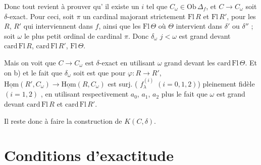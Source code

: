 \documentclass[11pt,a4paper]{article}
\begin{document}
Donc tout revient à prouver qu' il existe un $i$ 
tel que  $C_\omega \in \mathrm{Ob}\,\Delta_f$, et $C \to C_\omega$
soit $\delta$-exact. Pour ceci, soit $\pi$ un cardinal majorant strictement
$\mathrm{Fl}\,R$ et $\mathrm{Fl}\,R'$,  pour les
$R$, $R'$ qui interviennent dans $f$, ainsi que les $\mathrm{Fl}\,\Theta$ où
$\Theta$ intervient dans $\delta'$ ou $\delta''$ ; soit $\omega$ le plus petit
ordinal de cardinal $\pi$. Donc \ill{} $\delta_\omega$ \ill{} $j < \omega$
\ill{} est grand devant $\mathrm{card}\,\mathrm{Fl}\,R$,
$\mathrm{card}\,\mathrm{Fl}\,R'$, $\mathrm{Fl}\,\Theta$.


Mais on voit que $C \to C_\omega$ est $\delta$-exact en utilisant
 $\omega$ grand devant les $\mathrm{card}\,\mathrm{Fl}\,\Theta$. Et on
\ill{} b) et le fait que $\delta_\omega$ soit \ill{} est que pour
$\varphi : R \to R'$,
$\underline{\mathrm{Hom}}(R', C_\omega) \to \underline{\mathrm{Hom}}(R, C_\omega)$
est surj. \struck{\ill{}} (\ill{} $f^{(i)}_\lambda$ \ill{} $(i = 0,1,2)$)
\ill{} pleinement fidèle $(i = 1,2)$ \ill{}, en utilisant respectivement
$a_0$, $a_1$, $a_2$ plus le fait que $\omega$ est grand devant
\struck{\ill{}} $\mathrm{card}\,\mathrm{Fl}\,R$ et
$\mathrm{card}\,\mathrm{Fl}\,R'$.

Il reste donc à faire la construction de $K(C,\delta)$.

\section*{Conditions d'exactitude}
\end{document}
